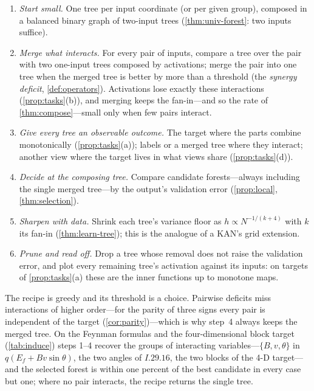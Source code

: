 \begin{procedure}\label{proc:recipe}
\leavevmode
\begin{enumerate}[leftmargin=*]
\item \emph{Start small.}  One tree per input coordinate (or per given group), composed in
  a balanced binary graph of two-input trees (\cref{thm:univ-forest}: two inputs suffice).
\item \emph{Merge what interacts.}  For every pair of inputs, compare a tree over the pair
  with two one-input trees composed by activations; merge the pair into one tree when the
  merged tree is better by more than a threshold (the \emph{synergy deficit},
  \cref{def:operators}).  Activations lose exactly these interactions
  (\cref{prop:tasks}(b)), and merging keeps the fan-in---and so the rate of
  \cref{thm:compose}---small only when few pairs interact.
\item \emph{Give every tree an observable outcome.}  The target where the parts combine
  monotonically (\cref{prop:tasks}(a)); labels or a merged tree where they interact; another
  view where the target lives in what views share (\cref{prop:tasks}(d)).
\item \emph{Decide at the composing tree.}  Compare candidate forests---always including
  the single merged tree---by the output's validation error (\cref{prop:local},
  \cref{thm:selection}).
\item \emph{Sharpen with data.}  Shrink each tree's variance floor as
  $h\propto N^{-1/(k+4)}$ with $k$ its fan-in (\cref{thm:learn-tree}); this is the analogue of
  a KAN's grid extension.
\item \emph{Prune and read off.}  Drop a tree whose removal does not raise the validation
  error, and plot every remaining tree's activation against its inputs: on targets of
  \cref{prop:tasks}(a) these are the inner functions up to monotone maps.
\end{enumerate}
\end{procedure}

The recipe is greedy and its threshold is a choice.  Pairwise deficits miss interactions of
higher order---for the parity of three signs every pair is independent of the target
(\cref{cor:parity})---which is why step~4 always keeps the merged tree.  On the Feynman formulas and the four-dimensional block target
(\cref{tab:induce}) steps 1--4 recover the groups of interacting variables---$\{B,v,\theta\}$ in
$q(E_f+Bv\sin\theta)$, the two angles of $I.29.16$, the two blocks of the 4-D target---and the
selected forest is within one percent of the best candidate in every case but one; where no
pair interacts, the recipe returns the single tree.

